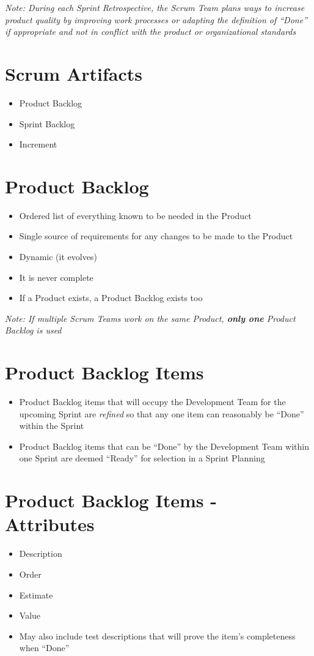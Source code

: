 \documentclass[a4paper,11pt,twocolumn]{article}
\begin{document}
\textit{Note: During each Sprint Retrospective, the Scrum Team plans ways to increase product quality by improving work processes or adapting the definition of ``Done'' if appropriate and not in conflict with the product or organizational standards}

\section*{Scrum Artifacts}
\begin{itemize}
	\item Product Backlog
	\item Sprint Backlog
	\item Increment
\end{itemize}

\section*{Product Backlog}
\begin{itemize}
	\item Ordered list of everything known to be needed in the Product
	\item Single source of requirements for any changes to be made to the Product
	\item Dynamic (it evolves)
	\item It is never complete
	\item If a Product exists, a Product Backlog exists too
\end{itemize}

\textit{Note: If multiple Scrum Teams work on the same Product, \textbf{only one} Product Backlog is used}

\section*{Product Backlog Items}
\begin{itemize}
	\item Product Backlog items that will occupy the Development Team for the upcoming Sprint are \textit{refined} so that any one item can reasonably be ``Done'' within the Sprint
    \item Product Backlog items that can be ``Done'' by the Development Team within one Sprint are deemed ``Ready'' for selection in a Sprint Planning
\end{itemize}

\section*{Product Backlog Items - Attributes}
\begin{itemize}
	\item Description
    \item Order
    \item Estimate
    \item Value
    \item May also include test descriptions that will prove the item's completeness when ``Done''
\end{itemize}
\end{document}
